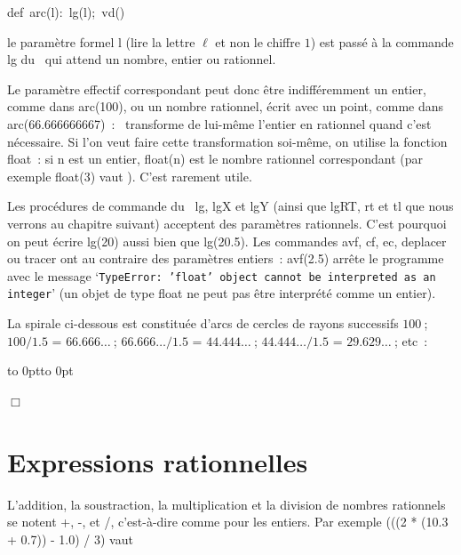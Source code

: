 \begin{center}
{\mcl def}\ {\idt arc(l):\ lg(l);\ vd()}
\end{center}

\noindent le paramètre formel {\idt l} (lire la lettre $\ell$ et non le chiffre $1$) est passé à la commande {\idt lg} du \robot\ qui
attend un nombre, entier ou rationnel.

Le paramètre effectif correspondant peut donc être indifféremment un entier, comme dans
{\idt arc(100)}, ou un nombre rationnel, écrit avec un point, comme dans {\idt arc(66.666666667)}~:
\python\ transforme de lui-même l'entier {} en rationnel {}
quand c'est nécessaire. Si l'on veut faire cette transformation soi-même, on utilise la
fonction {\idt float}~: si {\idt n} est un entier,
{\idt float(n)} est le nombre rationnel correspondant (par exemple
{\idt float(3)} vaut {}). C'est rarement utile.

Les procédures de commande du \robot\ {\idt lg}, {\idt lgX} et {\idt lgY} (ainsi que
{\idt lgRT}, {\idt rt} et {\idt tl} que nous verrons au chapitre suivant) acceptent des paramètres
rationnels. C'est pourquoi on peut écrire {\idt lg(20)} aussi bien que {\idt lg(20.5)}.
Les commandes {\idt avf}, {\idt cf}, {\idt ec}, {\idt deplacer} ou {\idt tracer}
ont au contraire des paramètres entiers~: {\idt avf(2.5)} arrête le programme avec le message
`{\tt TypeError:\ 'float' object cannot be interpreted as an integer}'
(un objet de type {\idt float} ne peut pas être interprété comme un entier).

\begin{exemple}{\rm
La spirale ci-dessous est constituée d'arcs de cercles de rayons successifs
$100$$\:$; $100 / 1.5$ = $66.666\ldots$$\:$; $66.666\ldots / 1.5$ = $44.444\ldots$$\:$;
$44.444\ldots / 1.5$ = $29.629\ldots$$\:$; etc~:

 {\raggedright
 \hbox to 0pt{\hspace*{2cm}\vbox to 0pt{}}
 
 }
\noindent $\Box$ }\end{exemple}

\section{Expressions rationnelles}
L'addition, la soustraction, la multiplication et la division de nombres rationnels se
notent {\idt +}, {\idt -}, {\idt *} et {\idt /}, c'est-à-dire comme pour les entiers. Par exemple
{\idt (((2 * (10.3 + 0.7)) - 1.0) / 3)} vaut {}

